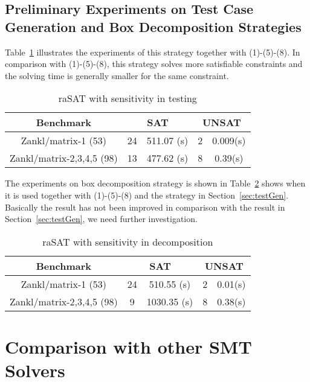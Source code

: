 \subsection*{Preliminary Experiments on Test Case Generation and Box Decomposition Strategies}

Table~\ref{tab:senInTest} illustrates the experiments of this strategy together with (1)-(5)-(8). In comparison with (1)-(5)-(8), this strategy solves more satisfiable constraints and the solving time is generally smaller for the same constraint.
\begin{table}
\begin{center}
\begin{tabular}{| c | c | c | c | c |}
\hline
Benchmark & \multicolumn{2}{|c|}{SAT} & \multicolumn{2}{c|}{UNSAT}\\ \hline
Zankl/matrix-1 (53) & 24 & 511.07 (s) & 2 & 0.009(s) \\ \hline
Zankl/matrix-2,3,4,5 (98) & 13 & 477.62 (s) & 8 & 0.39(s) \\ \hline
\end{tabular}
\end{center}
\caption{raSAT with sensitivity in testing}
\label{tab:senInTest}
\end{table}

The experiments on box decomposition strategy is shown in Table~\ref{tab:senInDec} shows when it is used together with (1)-(5)-(8) and the strategy in Section~\ref{sec:testGen}. Basically the result has not been improved in comparison with the result in Section~\ref{sec:testGen}, we need further investigation.
\begin{table}
\begin{center}
\begin{tabular}{| c | c | c | c | c |}
\hline
Benchmark & \multicolumn{2}{|c|}{SAT} & \multicolumn{2}{c|}{UNSAT}\\ \hline
Zankl/matrix-1 (53) & 24 & 510.55 (s) & 2 & 0.01(s) \\ \hline
Zankl/matrix-2,3,4,5 (98) & 9 & 1030.35 (s) & 8 & 0.38(s) \\ \hline
\end{tabular}
\end{center}
\caption{raSAT with sensitivity in decomposition} 
\label{tab:senInDec}
\end{table}

\section{Comparison with other SMT Solvers}

